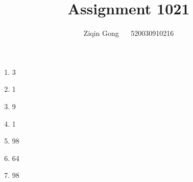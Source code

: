 \documentclass[12pt]{article}
\title{Assignment 1021}
\author{Ziqin Gong $\quad$ 520030910216}
\date{}
\begin{document}
  \maketitle

  \begin{enumerate}
    \item 3
    \item 1
    \item 9
    \item 1
    \item 98
    \item 64
    \item 98
  \end{enumerate}
\end{document}
